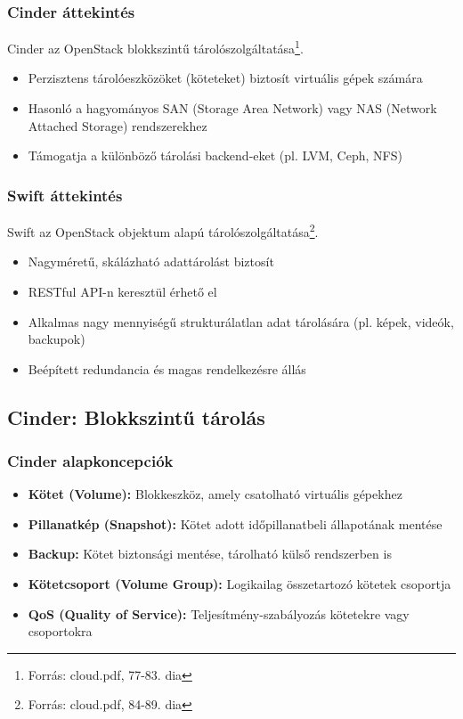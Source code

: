 \documentclass[a4paper,12pt]{article}
\begin{document}
    \subsubsection{Cinder áttekintés}

    Cinder az OpenStack blokkszintű tárolószolgáltatása\footnote{Forrás: cloud.pdf, 77-83. dia}.

    \begin{itemize}
        \item Perzisztens tárolóeszközöket (köteteket) biztosít virtuális gépek számára
        \item Hasonló a hagyományos SAN (Storage Area Network) vagy NAS (Network Attached Storage) rendszerekhez
        \item Támogatja a különböző tárolási backend-eket (pl. LVM, Ceph, NFS)
    \end{itemize}

    \subsubsection{Swift áttekintés}

    Swift az OpenStack objektum alapú tárolószolgáltatása\footnote{Forrás: cloud.pdf, 84-89. dia}.

    \begin{itemize}
        \item Nagyméretű, skálázható adattárolást biztosít
        \item RESTful API-n keresztül érhető el
        \item Alkalmas nagy mennyiségű strukturálatlan adat tárolására (pl. képek, videók, backupok)
        \item Beépített redundancia és magas rendelkezésre állás
    \end{itemize}

    \subsection{Cinder: Blokkszintű tárolás}

    \subsubsection{Cinder alapkoncepciók}

    \begin{itemize}
        \item \textbf{Kötet (Volume):} Blokkeszköz, amely csatolható virtuális gépekhez
        \item \textbf{Pillanatkép (Snapshot):} Kötet adott időpillanatbeli állapotának mentése
        \item \textbf{Backup:} Kötet biztonsági mentése, tárolható külső rendszerben is
        \item \textbf{Kötetcsoport (Volume Group):} Logikailag összetartozó kötetek csoportja
        \item \textbf{QoS (Quality of Service):} Teljesítmény-szabályozás kötetekre vagy csoportokra
    \end{itemize}
\end{document}
